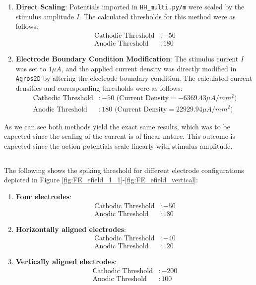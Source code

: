 \documentclass{article}
\begin{document}
    \begin{enumerate}
        \item \textbf{Direct Scaling}: Potentials imported in \texttt{HH\_multi.py/m} were scaled by the stimulus amplitude $I$. The calculated thresholds for this method were as follows:
        \begin{align*}
            \text{Cathodic Threshold} &: -50 \\
            \text{Anodic Threshold} &: 180
        \end{align*}

        \item \textbf{Electrode Boundary Condition Modification}: The stimulus current $I$ was set to $1\mu A$, and the applied current density was directly modified in \texttt{Agros2D} by altering the electrode boundary condition. The calculated current densities and corresponding thresholds were as follows:
        \begin{align*}
            \text{Cathodic Threshold} &: -50 \text{ (Current Density} = -6369.43\mu A/mm^2) \\
            \text{Anodic Threshold} &: 180 \text{ (Current Density} = 22929.94\mu A/mm^2)
        \end{align*}
    \end{enumerate}

    As we can see both methods yield the exact same results, which was to be expected since the scaling of the current is of linear nature.
    This outcome is expected since the action potentials scale linearly with stimulus amplitude.

    \subsection{}

    The following shows the spiking threshold for different electrode configurations depicted in Figure \ref{fig:FE_efield_1_1}-\ref{fig:FE_efield_vertical}:

    \begin{enumerate}
        \item \textbf{Four electrodes}:
        \begin{align*}
            \text{Cathodic Threshold} &: -50 \\
            \text{Anodic Threshold} &: 180
        \end{align*}
        \item \textbf{Horizontally aligned electrodes}:
        \begin{align*}
            \text{Cathodic Threshold} &: -40 \\
            \text{Anodic Threshold} &: 120
        \end{align*}

        \item \textbf{Vertically aligned electrodes}:
        \begin{align*}
            \text{Cathodic Threshold} &: -200 \\
            \text{Anodic Threshold} &: 100
        \end{align*}
    \end{enumerate}
\end{document}
